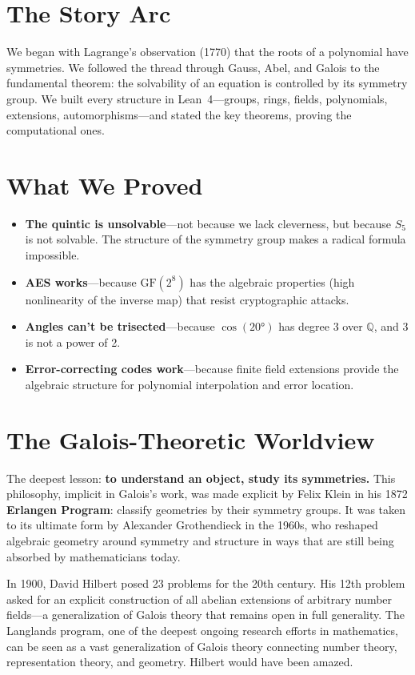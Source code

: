 \documentclass[11pt, a4paper, oneside]{book}
\newcommand{\Q}{\mathbb{Q}}
\newcommand{\GF}{\mathrm{GF}}
\begin{document}
\section{The Story Arc}

We began with Lagrange's observation (1770) that the roots of a polynomial
have symmetries. We followed the thread through Gauss, Abel, and Galois to
the fundamental theorem: the solvability of an equation is controlled by its
symmetry group. We built every structure in Lean~4---groups, rings, fields,
polynomials, extensions, automorphisms---and stated the key theorems, proving
the computational ones.

\section{What We Proved}

\begin{itemize}[nosep]
\item \textbf{The quintic is unsolvable}---not because we lack cleverness,
  but because $S_5$ is not solvable. The structure of the symmetry group
  makes a radical formula impossible.
\item \textbf{AES works}---because $\GF(2^8)$ has the algebraic properties
  (high nonlinearity of the inverse map) that resist cryptographic attacks.
\item \textbf{Angles can't be trisected}---because $\cos(20°)$ has
  degree 3 over $\Q$, and 3 is not a power of 2.
\item \textbf{Error-correcting codes work}---because finite field extensions
  provide the algebraic structure for polynomial interpolation and error
  location.
\end{itemize}

\section{The Galois-Theoretic Worldview}

The deepest lesson: \textbf{to understand an object, study its symmetries.}
This philosophy, implicit in Galois's work, was made explicit by Felix Klein
in his 1872 \textbf{Erlangen Program}: classify geometries by their symmetry
groups. It was taken to its ultimate form by Alexander Grothendieck in the
1960s, who reshaped algebraic geometry around symmetry and structure in ways
that are still being absorbed by mathematicians today.

\begin{historical}[title={Hilbert's 12th Problem and Beyond}]
In 1900, David Hilbert posed 23 problems for the 20th century. His 12th
problem asked for an explicit construction of all abelian extensions of
arbitrary number fields---a generalization of Galois theory that remains
open in full generality. The Langlands program, one of the deepest ongoing
research efforts in mathematics, can be seen as a vast generalization of
Galois theory connecting number theory, representation theory, and geometry.
Hilbert would have been amazed.
\end{historical}
\end{document}
